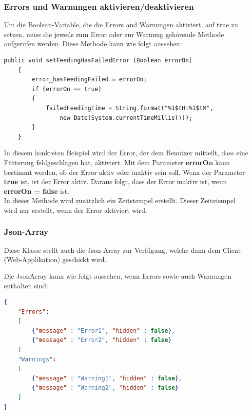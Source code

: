 \subsubsection{Errors und Warnungen aktivieren/deaktivieren}
Um die Boolean-Variable, die die Errors and Warnungen aktiviert, auf true zu setzen, muss die jeweils zum Error oder zur Warnung gehörende Methode aufgerufen werden. Diese Methode kann wie folgt aussehen:
\begin{lstlisting}[style=JavaStyle, caption=Error setzen]
public void setFeedingHasFailedError (Boolean errorOn)
    {
        error_hasFeedingFailed = errorOn;
        if (errorOn == true)
        {
            failedFeedingTime = String.format("%1$tH:%1$tM", 
            	new Date(System.currentTimeMillis()));
        }   
    }
\end{lstlisting}
In diesem konkreten Beispiel wird der Error, der dem Benutzer mitteilt, dass eine Fütterung fehlgeschlagen hat, aktiviert. Mit dem Parameter \textbf{errorOn} kann bestimmt werden, ob der Error aktiv oder inaktiv sein soll. Wenn der Parameter \textbf{true} ist, ist der Error aktiv. Daraus folgt, dass der Error inaktiv ist, wenn \textbf{errorOn = false} ist. 
\\ In dieser Methode wird zusätzlich ein Zeitstempel erstellt. Dieser Zeitstempel wird nur erstellt, wenn der Error aktiviert wird. 

\subsubsection{Json-Array} \label{subsubsec:Array}
Diese Klasse stellt auch die Json-Array zur Verfügung, welche dann dem Client (Web-Applikation) geschickt wird. 

Die JsonArray kann wie folgt aussehen, wenn Errors sowie auch Warnungen enthalten sind:

\begin{lstlisting}[language=json,firstnumber=1, caption=Json-Objekt mit Errors und Warnungen]
{ 
	"Errors": 
	[ 
		{"message" : "Error1", "hidden" : false}, 
		{"message" : "Error2", "hidden" : false} 
	] 
	"Warnings": 
	[ 
		{"message" : "Warning1", "hidden" : false}, 
		{"message" : "Warning2", "hidden" : false} 
	] 
} 
\end{lstlisting}

\newpage

